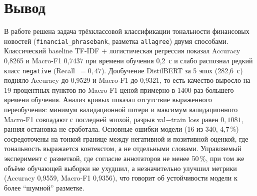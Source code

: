 \documentclass[14pt,a4paper]{extarticle}
\begin{document}
\section{Вывод}

В работе решена задача трёхклассовой классификации тональности финансовых новостей
(\texttt{financial\_phrasebank}, разметка \texttt{allagree}) двумя способами.
Классический baseline TF-IDF + логистическая регрессия показал Accuracy 0{,}8265 и
Macro-F1 0{,}7437 при времени обучения 0{,}2~с и слабо распознал редкий класс
\texttt{negative} (Recall~$=0{,}47$). Дообучение DistilBERT за 5 эпох (282{,}6~с)
подняло Accuracy до 0{,}9529 и Macro-F1 до 0{,}9321, то есть качество выросло на
19 процентных пунктов по Macro-F1 ценой примерно в 1400 раз большего времени
обучения. Анализ кривых показал отсутствие выраженного переобучения: минимум
валидационной потери и максимум валидационного Macro-F1 совпадают с последней
эпохой, разрыв val$-$train loss равен $0{,}1081$, ранняя остановка не сработала.
Основные ошибки модели (16 из 340, 4{,}7\,\%) сосредоточены на тонкой границе
между негативной и позитивной оценкой, где тональность выражается контекстом, а не
отдельными словами. Управляемый эксперимент с разметкой, где согласие аннотаторов
не менее 50\,\%, при том же объёме обучающей выборки не ухудшил, а незначительно
улучшил метрики (Accuracy 0{,}9559, Macro-F1 0{,}9356), что говорит об устойчивости
модели к более ``шумной'' разметке.
\end{document}
